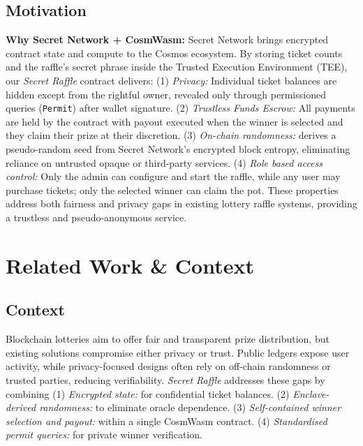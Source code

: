\documentclass{article}
\begin{document}
\subsection{Motivation}
\textbf{Why Secret Network + CosmWasm:} Secret Network brings encrypted contract state and compute to the Cosmos ecosystem. By storing ticket counts and the raffle's secret phrase inside the Trusted Execution Environment (TEE), our \emph{Secret Raffle} contract delivers: (1) \emph{Privacy:} Individual ticket balances are hidden except from the rightful owner, revealed only through permissioned queries (\texttt{Permit}) after wallet signature. (2) \emph{Trustless Funds Escrow:} All payments are held by the contract with payout executed when the winner is selected and they claim their prize at their discretion. (3) \emph{On-chain randomness:} derives a pseudo-random seed from Secret Network's encrypted block entropy, eliminating reliance on untrusted opaque or third-party services. (4) \emph{Role based access control:} Only the admin can configure and start the raffle, while any user may purchase tickets; only the selected winner can claim the pot. These properties address both fairness and privacy gaps in existing lottery raffle systems, providing a trustless and pseudo-anonymous service.

\section{Related Work \& Context}
\subsection{Context}
Blockchain lotteries aim to offer fair and transparent prize distribution, but existing solutions compromise either privacy or trust. Public ledgers expose user activity, while privacy-focused designs often rely on off-chain randomness or trusted parties, reducing verifiability. \emph{Secret Raffle} addresses these gaps by combining (1) \emph{Encrypted state:} for confidential ticket balances. (2) \emph{Enclave-derived randomness:} to eliminate oracle dependence. (3) \emph{Self-contained winner selection and payout:} within a single CosmWasm contract. (4) \emph{Standardised permit queries:} for private winner verification.
\end{document}
